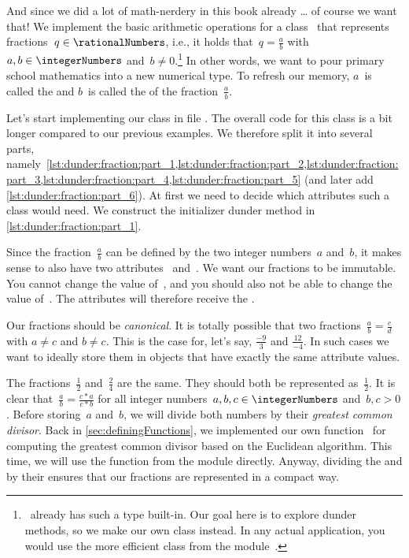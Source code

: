 And since we did a lot of math-nerdery in this book already {\dots} of course we want that!
We implement the basic arithmetic operations for a class~ that represents fractions~$q\in\rationalNumbers$, i.e., it holds that~$q=\frac{a}{b}$ with~$a,b\in\integerNumbers$ and~$b\neq0$.\footnote{
\python\ already has such a type built-in. %
Our goal here is to explore dunder methods, so we make our own class instead. %
In any actual application, you would use the more efficient class  from the module~.%
}
In other words, we want to pour primary school mathematics into a new numerical type.
To refresh our memory, $a$~is called the  and $b$~is called the  of the fraction~$\frac{a}{b}$.

Let's start implementing our class  in file .
The overall code for this class is a bit longer compared to our previous examples.
We therefore split it into several parts, namely~\cref{lst:dunder:fraction:part_1,lst:dunder:fraction:part_2,lst:dunder:fraction:part_3,lst:dunder:fraction:part_4,lst:dunder:fraction:part_5} (and later add \cref{lst:dunder:fraction:part_6}).
At first we need to decide which attributes such a class would need.
We construct the initializer dunder method  in \cref{lst:dunder:fraction:part_1}.

Since the fraction~$\frac{a}{b}$ can be defined by the two integer numbers~$a$ and~$b$, it makes sense to also have two  attributes~ and~.
We want our fractions to be immutable.
You cannot change the value of~, and you should also not be able to change the value of~.
The attributes will therefore receive the  .

Our fractions should be \emph{canonical}.
It is totally possible that two fractions~$\frac{a}{b}=\frac{c}{d}$ with $a\neq c$ and $b\neq c$.
This is the case for, let's say, $\frac{-9}{3}$ and $\frac{12}{-4}$.
In such cases we want to ideally store them in objects that have exactly the same attribute values.

The fractions~$\frac{1}{2}$ and~$\frac{2}{4}$ are the same.
They should both be represented as~$\frac{1}{2}$.
It is clear that~$\frac{a}{b}=\frac{c*a}{c*b}$ for all integer numbers~$a,b,c\in\integerNumbers$ and~$b,c>0$.
Before storing~$a$ and~$b$, we will divide both numbers by their \emph{greatest common divisor}.
Back in \cref{sec:definingFunctions}, we implemented our own function~ for computing the greatest common divisor based on the Euclidean algorithm.
This time, we will use the  function from the  module directly.
Anyway, dividing the  and  by their  ensures that our fractions are represented in a compact way.

